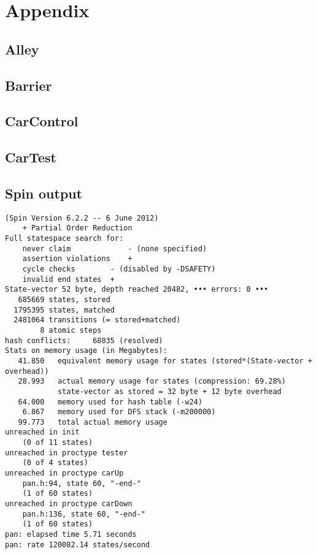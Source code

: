 \section{Appendix}

\subsection{Alley}


\newpage

\subsection{Barrier}


\newpage

\subsection{CarControl}


\newpage

\subsection{CarTest}


\newpage

\subsection{Spin output}
\label{app:spin_out}
\begin{verbatim}
(Spin Version 6.2.2 -- 6 June 2012)
	+ Partial Order Reduction
Full statespace search for:
	never claim         	- (none specified)
	assertion violations	+
	cycle checks       	- (disabled by -DSAFETY)
	invalid end states	+
State-vector 52 byte, depth reached 20482, ••• errors: 0 •••
   685669 states, stored
  1795395 states, matched
  2481064 transitions (= stored+matched)
        8 atomic steps
hash conflicts:     68035 (resolved)
Stats on memory usage (in Megabytes):
   41.850	equivalent memory usage for states (stored*(State-vector + overhead))
   28.993	actual memory usage for states (compression: 69.28%)
         	state-vector as stored = 32 byte + 12 byte overhead
   64.000	memory used for hash table (-w24)
    6.867	memory used for DFS stack (-m200000)
   99.773	total actual memory usage
unreached in init
	(0 of 11 states)
unreached in proctype tester
	(0 of 4 states)
unreached in proctype carUp
	pan.h:94, state 60, "-end-"
	(1 of 60 states)
unreached in proctype carDown
	pan.h:136, state 60, "-end-"
	(1 of 60 states)
pan: elapsed time 5.71 seconds
pan: rate 120082.14 states/second
\end{verbatim}

